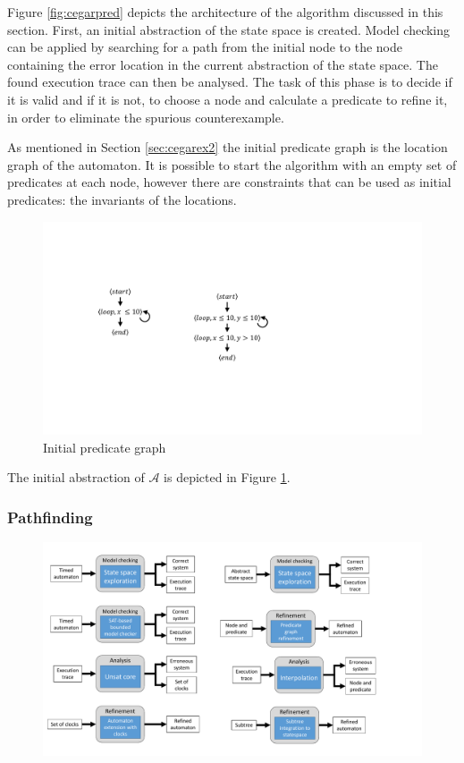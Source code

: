 Figure \ref{fig:cegarpred} depicts the architecture of the algorithm discussed in this section. First, an initial abstraction of the state space is created. Model checking can be applied by searching for a path from the initial node to the node containing the error location in the current abstraction of the state space.
The found execution trace can then be analysed. The task of this phase is to decide if it is valid and if it is not, to choose a node and calculate a predicate to refine it, in order to eliminate the spurious counterexample.

As mentioned in Section \ref{sec:cegarex2} the initial predicate graph is the location graph of the automaton. It is possible to start the algorithm with an empty set of predicates at each node, however there are constraints that can be used as initial predicates: the invariants of the locations.

\begin{figure} 
	\centering
	\includegraphics[width=.2\textwidth]{include/figures/runex_pred_init}
	\caption{Initial predicate graph}
	\label{fig:predinit}
\end{figure}

\begin{runningExample}
	The initial abstraction of $\mathcal{A}$ is depicted in Figure \ref{fig:predinit}.
\end{runningExample}

\subsubsection{Pathfinding}

\begin{figure}[h]
	\centering
	\includegraphics[width=.7\textwidth]{include/figures/modules_ssp_mc}
\end{figure}

